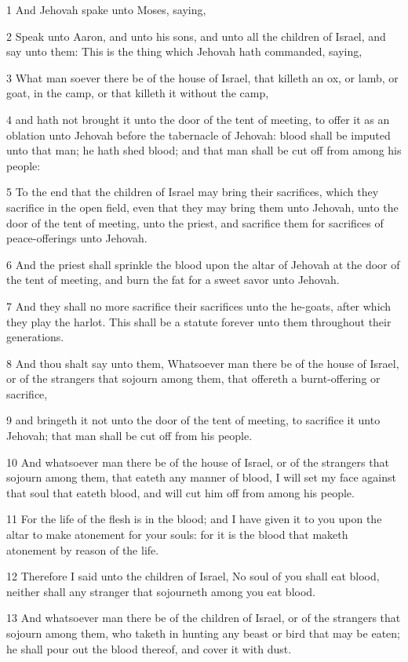 \par 1 And Jehovah spake unto Moses, saying,
\par 2 Speak unto Aaron, and unto his sons, and unto all the children of Israel, and say unto them: This is the thing which Jehovah hath commanded, saying,
\par 3 What man soever there be of the house of Israel, that killeth an ox, or lamb, or goat, in the camp, or that killeth it without the camp,
\par 4 and hath not brought it unto the door of the tent of meeting, to offer it as an oblation unto Jehovah before the tabernacle of Jehovah: blood shall be imputed unto that man; he hath shed blood; and that man shall be cut off from among his people:
\par 5 To the end that the children of Israel may bring their sacrifices, which they sacrifice in the open field, even that they may bring them unto Jehovah, unto the door of the tent of meeting, unto the priest, and sacrifice them for sacrifices of peace-offerings unto Jehovah.
\par 6 And the priest shall sprinkle the blood upon the altar of Jehovah at the door of the tent of meeting, and burn the fat for a sweet savor unto Jehovah.
\par 7 And they shall no more sacrifice their sacrifices unto the he-goats, after which they play the harlot. This shall be a statute forever unto them throughout their generations.
\par 8 And thou shalt say unto them, Whatsoever man there be of the house of Israel, or of the strangers that sojourn among them, that offereth a burnt-offering or sacrifice,
\par 9 and bringeth it not unto the door of the tent of meeting, to sacrifice it unto Jehovah; that man shall be cut off from his people.
\par 10 And whatsoever man there be of the house of Israel, or of the strangers that sojourn among them, that eateth any manner of blood, I will set my face against that soul that eateth blood, and will cut him off from among his people.
\par 11 For the life of the flesh is in the blood; and I have given it to you upon the altar to make atonement for your souls: for it is the blood that maketh atonement by reason of the life.
\par 12 Therefore I said unto the children of Israel, No soul of you shall eat blood, neither shall any stranger that sojourneth among you eat blood.
\par 13 And whatsoever man there be of the children of Israel, or of the strangers that sojourn among them, who taketh in hunting any beast or bird that may be eaten; he shall pour out the blood thereof, and cover it with dust.
